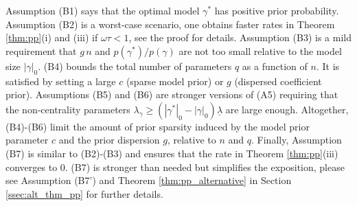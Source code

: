 Assumption (B1) says that the optimal model $\gamma^*$ has positive prior probability. Assumption (B2) is a worst-case scenario, one obtains faster rates in Theorem \ref{thm:pp}(i) and (iii) if $\omega \tau < 1$, see the proof for details. 
Assumption (B3) is a mild requirement that $g\, n$ and $p(\gamma^*)/p(\gamma)$ are not too small relative to the model size $|\gamma|_0$.
(B4) bounds the total number of parameters $q$ as a function of $n$. It is satisfied by setting a large $c$ (sparse model prior) or $g$ (dispersed coefficient prior).
Assumptions (B5) and (B6) are stronger versions of (A5) requiring that the non-centrality parameters $\lambda_\gamma \geq (|\gamma^*|_0 - |\gamma|_0) \underline{\lambda}$ are large enough.
Altogether, (B4)-(B6) limit the amount of prior sparsity induced by the model prior parameter $c$ and the prior dispersion $g$, relative to $n$ and $q$.
Finally, Assumption (B7) is similar to (B2)-(B3) and ensures that the rate in Theorem \ref{thm:pp}(iii) converges to 0. 
(B7) is stronger than needed but simplifies the exposition, %
please see Assumption (B7') and Theorem \ref{thm:pp_alternative} in Section \ref{ssec:alt_thm_pp} for further details.



